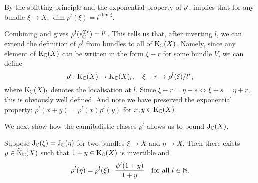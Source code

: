 \begin{remark}
  \label{cannibal-dim}
  By the splitting principle and the exponential property of $\rho^l$,
   implies that for any bundle $\xi \to X$,
  $\dim \rho^l(\xi) = l^{\dim \xi}$.
\end{remark}

\begin{nothing}
  Combining  and  gives
  $\rho^l(\epsilon_{\mathbb{C}}^{\oplus r}) = l^r$. This tells us that, after
  inverting $l$, we can extend the definition of $\rho^l$ from bundles
  to all of $\mathrm{K}_{\mathbb{C}}(X)$. Namely, since any element of $\mathrm{K}_{\mathbb{C}}(X)$ can be
  written in the form $\xi - r$ for some bundle $V$, we can define
  \[
  \rho^l \colon \mathrm{K}_{\mathbb{C}}(X) \to \mathrm{K}_{\mathbb{C}}(X)_l, \quad \xi - r \mapsto
  \rho^l(\xi)/l^r,
  \]
  where $\mathrm{K}_{\mathbb{C}}(X)_l$ denotes the localisation at $l$. Since $\xi - r =
  \eta - s \iff \xi + s = \eta + r$, this is obviously well
  defined. And note we have preserved the exponential property:
  $\rho^l(x+y) = \rho^l(x)\rho^l(y)$ for $x,y \in \mathrm{K}_{\mathbb{C}}(X)$.
\end{nothing}

We next show how the cannibalistic classes $\rho^l$ allows us to bound
$\mathrm{J}_{\mathbb{C}}(X)$.

\begin{lemma}
  \label{jprime-condition}
  Suppose $\mathrm{J}_{\mathbb{C}}(\xi) = \mathrm{J}_{\mathbb{C}}(\eta)$ for two bundles $\xi \to X$ and
  $\eta \to X$. Then there exists $y \in \widetilde{\mathrm{K}}_{\mathbb{C}}(X)$ such that $1+y
  \in \mathrm{K}_{\mathbb{C}}(X)$ is invertible and
  \[
  \rho^l(\eta) = \rho^l(\xi) \cdot \frac{\psi^l(1+y)}{1+y} \quad
  \text{for all } l \in \mathbb{N}.
  \]
\end{lemma}

